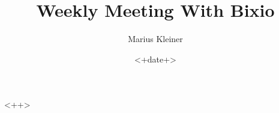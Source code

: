 \documentclass[a4paper]{article}
\title{Weekly Meeting With Bixio}
\author{Marius Kleiner}
\date{<+date+>}
\theoremstyle{definition}
\begin{document}
\maketitle

<++>

%
\end{document}
